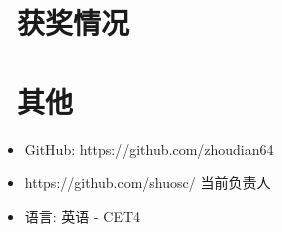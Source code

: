 \documentclass{resume}
\begin{document}
\section{\faHeartO\ 获奖情况}

\section{\faInfo\ 其他}
\begin{itemize}[parsep=0.5ex]
  \item GitHub: https://github.com/zhoudian64
  \item https://github.com/shuosc/ 当前负责人
  \item 语言: 英语 - CET4
\end{itemize}

%
%
\end{document}
